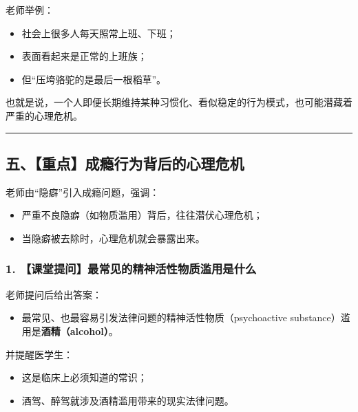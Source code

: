 \documentclass[
  chinese,
  9pt,
  a4paper,
]{ctexart}
\providecommand{\tightlist}{%
  \setlength{\itemsep}{0pt}\setlength{\parskip}{0pt}}
\begin{document}
老师举例：

\begin{itemize}
\tightlist
\item
  社会上很多人每天照常上班、下班；
\item
  表面看起来是正常的上班族；
\item
  但``压垮骆驼的是最后一根稻草''。
\end{itemize}

也就是说，一个人即便长期维持某种习惯化、看似稳定的行为模式，也可能潜藏着严重的心理危机。

\begin{center}\rule{0.5\linewidth}{0.5pt}\end{center}

\subsection{五、【重点】成瘾行为背后的心理危机}\label{ux4e94ux91cdux70b9ux6210ux763eux884cux4e3aux80ccux540eux7684ux5fc3ux7406ux5371ux673a}

老师由``隐癖''引入成瘾问题，强调：

\begin{itemize}
\tightlist
\item
  严重不良隐癖（如物质滥用）背后，往往潜伏心理危机；
\item
  当隐癖被去除时，心理危机就会暴露出来。
\end{itemize}

\subsubsection{1.
【课堂提问】最常见的精神活性物质滥用是什么}\label{ux8bfeux5802ux63d0ux95eeux6700ux5e38ux89c1ux7684ux7cbeux795eux6d3bux6027ux7269ux8d28ux6ee5ux7528ux662fux4ec0ux4e48}

老师提问后给出答案：

\begin{itemize}
\tightlist
\item
  最常见、也最容易引发法律问题的精神活性物质（psychoactive
  substance）滥用是\textbf{酒精（alcohol）}。
\end{itemize}

并提醒医学生：

\begin{itemize}
\tightlist
\item
  这是临床上必须知道的常识；
\item
  酒驾、醉驾就涉及酒精滥用带来的现实法律问题。
\end{itemize}
\end{document}

